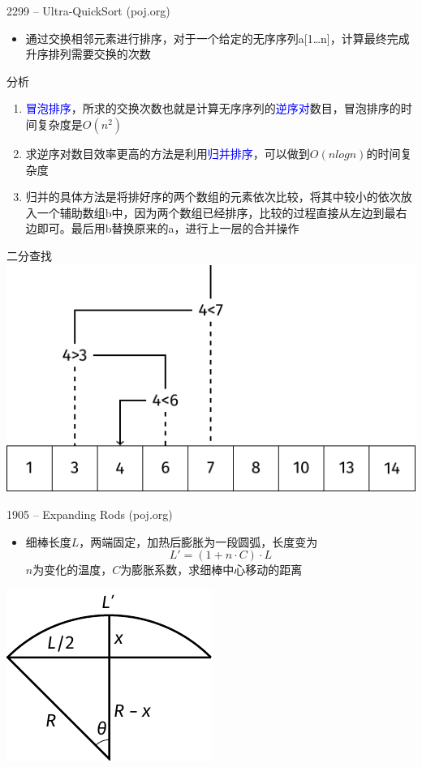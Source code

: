 \begin{frame}{2299 -- Ultra-QuickSort (poj.org)}
    \begin{itemize}
        \item 通过交换相邻元素进行排序，对于一个给定的无序序列a[1…n]，计算最终完成升序排列需要交换的次数
    \end{itemize}
    \vfill
    分析
    \begin{enumerate}
        \item \textcolor{blue}{冒泡排序}，所求的交换次数也就是计算无序序列的\textcolor{blue}{逆序对}数目，冒泡排序的时间复杂度是$O(n^2)$
        \item 求逆序对数目效率更高的方法是利用\textcolor{blue}{归并排序}，可以做到$O(nlogn)$的时间复杂度
        \item 归并的具体方法是将排好序的两个数组的元素依次比较，将其中较小的依次放入一个辅助数组b中，因为两个数组已经排序，比较的过程直接从左边到最右边即可。最后用b替换原来的a，进行上一层的合并操作
    \end{enumerate}
\end{frame}
\begin{frame}{二分查找}
    \includegraphics{fig/2-4.pdf}
\end{frame}
\begin{frame}{1905 -- Expanding Rods (poj.org)}
    \begin{itemize}
        \item 细棒长度$L$，两端固定，加热后膨胀为一段圆弧，长度变为
        $$L'=(1+n\cdot C)\cdot L$$
        $n$为变化的温度，$C$为膨胀系数，求细棒中心移动的距离
    \end{itemize}
    \vfill
    \includegraphics[center]{fig/2-5.pdf}
\end{frame}
